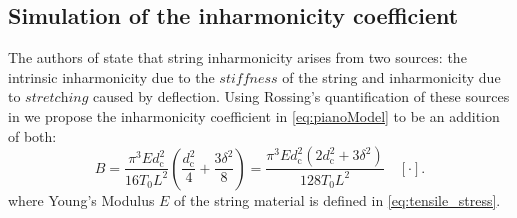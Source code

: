 \documentclass{article}
\begin{document}
\begin{sloppy}
\subsection{Simulation of the inharmonicity coefficient}\label{sec:Bsimulation}
The authors of \cite{coltShank} state that string inharmonicity arises from two sources: the intrinsic inharmonicity due to the $\textit{stiffness}$ of the string and inharmonicity due to $\textit{stretching}$ caused by deflection. Using Rossing's quantification of these sources in \cite{rossing:science_of_string_instruments} we propose the inharmonicity coefficient in \eqref{eq:pianoModel} to be an addition of both:
\begin{equation}\label{eq:totalInharmonicity}
    B =  \frac {\pi^3 E d_\text{c}^2}{16 T_0 L^2}\left(\frac {d_\text{c}^2}{4}   +  \frac {3\delta^2}{8} \right)  =  \frac{\pi^3 E d_\text{c}^2(2d_\text{c}^2 + 3\delta^2)}{128 T_0 L^2}\quad [\cdot].
\end{equation}
where Young's Modulus $E$ of the string material is defined in \eqref{eq:tensile_stress}.
%
%

\end{sloppy}
\end{document}
